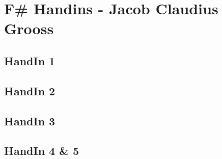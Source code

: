 \section{F\# Handins - Jacob Claudius Grooss}
\label{Appendix_FSharp_Grooss}

\subsection{HandIn 1}
\label{Appendix_FSharp_Grooss_1}
\subsection{HandIn 2}
\label{Appendix_FSharp_Grooss_2}
\subsection{HandIn 3}
\label{Appendix_FSharp_Grooss_3}
\subsection{HandIn 4 \& 5}
\label{Appendix_FSharp_Grooss_4and5}